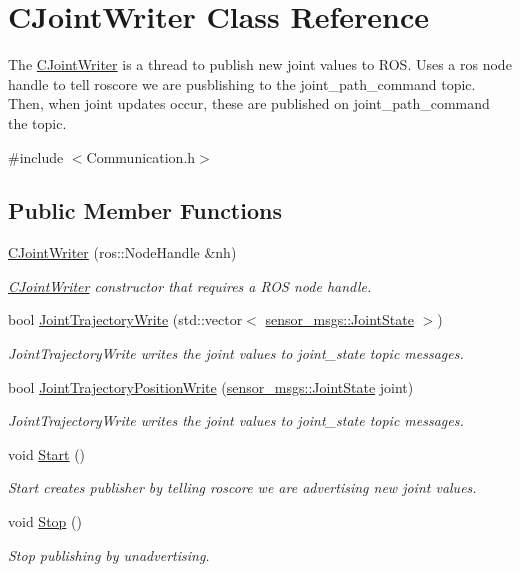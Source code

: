 \hypertarget{classCJointWriter}{\section{C\-Joint\-Writer Class Reference}
\label{classCJointWriter}
}


The \hyperlink{classCJointWriter}{C\-Joint\-Writer} is a thread to publish new joint values to R\-O\-S. Uses a ros node handle to tell roscore we are pusblishing to the joint\-\_\-path\-\_\-command topic. Then, when joint updates occur, these are published on joint\-\_\-path\-\_\-command the topic.  




{\ttfamily \#include $<$Communication.\-h$>$}

\subsection*{Public Member Functions}
\begin{DoxyCompactItemize}
\item 
\hyperlink{classCJointWriter_a15a0d974f05053a4270d4bc12233abaa}{C\-Joint\-Writer} (ros\-::\-Node\-Handle \&nh)
\begin{DoxyCompactList}\small\item\em \hyperlink{classCJointWriter}{C\-Joint\-Writer} constructor that requires a R\-O\-S node handle. \end{DoxyCompactList}\item 
bool \hyperlink{classCJointWriter_adc81d4ad1fee998f98a9e6eba6066da8}{Joint\-Trajectory\-Write} (std\-::vector$<$ \hyperlink{RCS_8h_aa4adb93a26caa4dacba9c9614e283245}{sensor\-\_\-msgs\-::\-Joint\-State} $>$)
\begin{DoxyCompactList}\small\item\em Joint\-Trajectory\-Write writes the joint values to joint\-\_\-state topic messages. \end{DoxyCompactList}\item 
bool \hyperlink{classCJointWriter_a16ffa1605dd37808b21c5082e03a9ba0}{Joint\-Trajectory\-Position\-Write} (\hyperlink{RCS_8h_aa4adb93a26caa4dacba9c9614e283245}{sensor\-\_\-msgs\-::\-Joint\-State} joint)
\begin{DoxyCompactList}\small\item\em Joint\-Trajectory\-Write writes the joint values to joint\-\_\-state topic messages. \end{DoxyCompactList}\item 
void \hyperlink{classCJointWriter_ae4fd546b8f34ecd4341703a9391b1926}{Start} ()
\begin{DoxyCompactList}\small\item\em Start creates publisher by telling roscore we are advertising new joint values. \end{DoxyCompactList}\item 
void \hyperlink{classCJointWriter_a3fc1ea80c4aeee9d676d0e6386822387}{Stop} ()
\begin{DoxyCompactList}\small\item\em Stop publishing by unadvertising. \end{DoxyCompactList}\end{DoxyCompactItemize}
